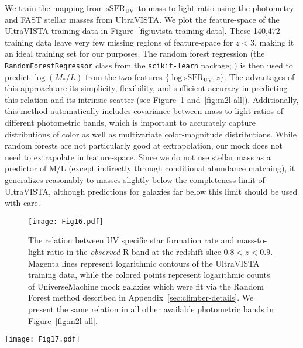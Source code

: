 \documentclass[twocolumn,twocolappendix]{aastex63}
\newcommand{\ssfruv}{$\mathrm{sSFR_{UV}}$}
\begin{document}
We train the mapping from \ssfruv\ to mass-to-light ratio using the photometry and FAST stellar masses from UltraVISTA. We plot the feature-space of the UltraVISTA training data in Figure~\ref{fig:uvista-training-data}. These 140,{}472 training data leave very few missing regions of feature-space for $z < 3$, making it an ideal training set for our purposes. The random forest regression (the \verb|RandomForestRegressor| class from the \verb|scikit-learn| package; \citealt{Pedregosa:2012}) is then used to predict $\log(M_\ast/L)$ from the two features $\{\mathrm{\log sSFR_{UV}}, z\}$. The advantages of this approach are its simplicity, flexibility, and sufficient accuracy in predicting this relation and its intrinsic scatter (see Figure~\ref{fig:m2l} and~\ref{fig:m2l-all}). Additionally, this method automatically includes covariance between mass-to-light ratios of different photometric bands, which is important to accurately capture distributions of color as well as multivariate color-magnitude distributions. While random forests are not particularly good at extrapolation, our mock does not need to extrapolate in feature-space. Since we do not use stellar mass as a predictor of M/L (except indirectly through conditional abundance matching), it generalizes reasonably to masses slightly below the completeness limit of UltraVISTA, although predictions for galaxies far below this limit should be used with care.



\begin{figure}[ht!]
\texttt{[image: Fig16.pdf]}
\caption{The relation between UV specific star formation rate and mass-to-light ratio in the \textit{observed} R band at the redshift slice $0.8<z<0.9$. Magenta lines represent logarithmic contours of the UltraVISTA training data, while the colored points represent logarithmic counts of UniverseMachine mock galaxies which were fit via the Random Forest method described in Appendix~\ref{sec:climber-details}. We present the same relation in all other available photometric bands in Figure~\ref{fig:m2l-all}.
\label{fig:m2l}}
\end{figure}

\begin{figure*}[ht!]
\centering
\texttt{[image: Fig17.pdf]}
\caption{The relation between UV specific star formation rate and mass-to-light ratio in the redshift slice $0.8<z<0.9$. Same as Figure~\ref{fig:m2l} but the y-axes represent the mass-to-light ratio in all other available photometric bands. The dashed line in each panel is the best-fit line for the R-band as a reference point.
\label{fig:m2l-all}}
\end{figure*}
\end{document}
